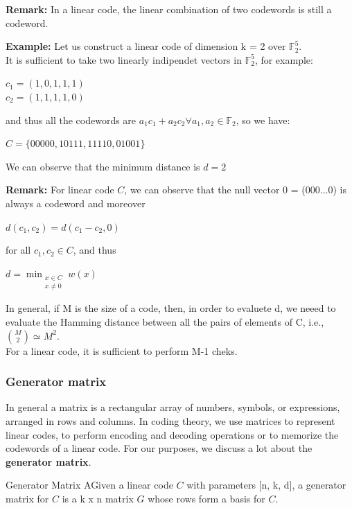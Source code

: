 \noindent
\textbf{Remark:}
In a linear code, the linear combination of two codewords is still a codeword.
\vspace{1 cm}

\noindent
\textbf{Example:}
Let us construct a linear code of dimension k = 2 over $\mathbb{F}^5_2$.\\
It is sufficient to take two linearly indipendet vectors in $\mathbb{F}^5_2$, for example:
\begin{center}
    $c_1 = (1, 0, 1, 1 , 1)$\\
    $c_2 = (1, 1, 1, 1, 0)$
\end{center}
\noindent
and thus all the codewords are $a_1 c_1 + a_2 c_2 \forall a_1, a_2 \in \mathbb{F}_2$, so we have:\\
\begin{center}
    $C = \{00000, 10111, 11110, 01001\}$
\end{center}
\noindent
We can observe that the minimum distance is $d = 2$
\vspace{1 cm}


\noindent
\textbf{Remark:}
For linear code $C$, we can observe that the null vector 0 = (000...0) is always a codeword and moreover
\begin{center}
    $d(c_1, c_2) = d(c_1 - c_2, 0)$
\end{center}
\noindent
for all $c_1, c_2 \in C$, and thus
\begin{center}
    $ d = \min_{\substack{x \in C \\ x \neq 0}} w(x) $
\end{center}
\noindent
In general, if M is the size of a code, then, in order to evaluete d, we neeed to evaluate the Hamming distance between all the pairs of elements of C, i.e., $\binom{M}{2} \simeq M^2$.\\
For a linear code, it is sufficient to perform M-1 cheks.

\subsubsection{Generator matrix}
In general a matrix is a rectangular array of numbers, symbols, or expressions, arranged in rows and columns. In coding theory, we use matrices to represent linear codes, to perform encoding and decoding operations or to memorize the codewords of a linear code.
\medskip
For our purposes, we discuss a lot about the \textbf{generator matrix}.

\begin{defBox}{Generator Matrix}
    AGiven a linear code $C$ with parameters [n, k, d], a generator matrix for $C$ is a k x n matrix $G$ whose rows form a basis for $C$. 
\end{defBox}


